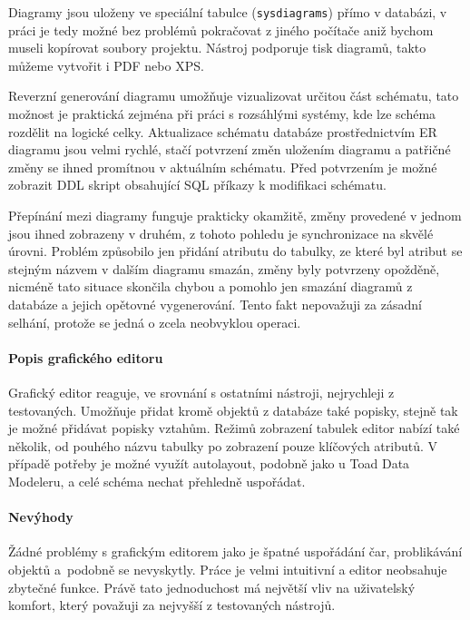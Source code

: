 \documentclass[czech,bachelor,public,dept460,male,oneside]{diploma}
\begin{document}
		Diagramy jsou uloženy ve speciální tabulce (\texttt{sysdiagrams}) přímo v databázi, v práci je tedy možné bez problémů pokračovat z jiného počítače aniž bychom museli kopírovat soubory projektu. Nástroj podporuje tisk diagramů, takto můžeme vytvořit i PDF nebo XPS.
		
		Reverzní generování diagramu umožňuje vizualizovat určitou část schématu, tato možnost je praktická zejména při práci s rozsáhlými systémy, kde lze schéma rozdělit na logické celky. Aktualizace schématu databáze prostřednictvím ER diagramu jsou velmi rychlé, stačí potvrzení změn uložením diagramu a patřičné změny se ihned promítnou v aktuálním schématu. Před potvrzením je možné zobrazit DDL skript obsahující SQL příkazy k modifikaci schématu. 
		
		Přepínání mezi diagramy funguje prakticky okamžitě, změny provedené v jednom jsou ihned zobrazeny v druhém, z tohoto pohledu je synchronizace na skvělé úrovni. Problém způsobilo jen přidání atributu do tabulky, ze které byl atribut se stejným názvem v dalším diagramu smazán, změny byly potvrzeny opožděně, nicméně tato situace skončila chybou a pomohlo jen smazání diagramů z databáze a jejich opětovné vygenerování. Tento fakt nepovažuji za zásadní selhání, protože se jedná o zcela neobvyklou operaci.
		
		
		\paragraph{Popis grafického editoru}
		Grafický editor reaguje, ve srovnání s ostatními nástroji, nejrychleji z testovaných. Umožňuje přidat kromě objektů z databáze také popisky, stejně tak je možné přidávat popisky vztahům. Režimů zobrazení tabulek editor nabízí také několik, od pouhého názvu tabulky po zobrazení pouze klíčových atributů. V případě potřeby je možné využít autolayout, podobně jako u Toad Data Modeleru, a celé schéma nechat přehledně uspořádat. 
		
		\paragraph{Nevýhody}
		Žádné problémy s grafickým editorem jako je špatné uspořádání čar, problikávání objektů a~podobně se nevyskytly. Práce je velmi intuitivní a editor neobsahuje zbytečné funkce. Právě tato jednoduchost má největší vliv na uživatelský komfort, který považuji za nejvyšší z testovaných nástrojů.
		
\end{document}
